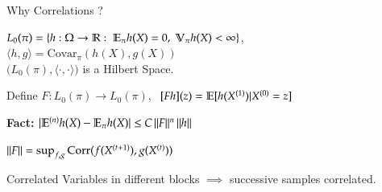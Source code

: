\documentclass[serif,mathserif,final]{beamer}
\newcommand{\itemlinespace}{0.22in}
\newcommand{\insertlinespace}{\vspace{\itemlinespace}}
\begin{document}
\begin{frame}{}
\begin{columns}[t]
\begin{column}{0.49\linewidth}
\begin{block}{\Huge Why Correlations ?}
{      $L_0(\pi) = \{ h:\Omega \rightarrow \mathbb{R} :\; \mathbb{E}_{\pi} h(X) = 0, \;
                        \mathbb{V}_{\pi}h(X) < \infty \}$, \hspace{0.05in}
      $\langle h, g \rangle = \text{Covar}_\pi(h(X), g(X))$ \\
      $\big(L_0(\pi), \langle \cdot, \cdot \rangle \big)$ is a Hilbert Space.
      \insertlinespace

      Define $F:L_0(\pi) \rightarrow L_0(\pi)$,
        $ \,\; [Fh](z) = \mathbb{E}[h(X^{(1)}) | X^{(0)} = z]$ \\
      \insertlinespace
 
      \textbf{Fact:}
      $| \mathbb{E}^{(n)} h(X) - \mathbb{E}_\pi h(X) | \leq C \, \|F\|^n \, \|h\|$
      \insertlinespace

      $\|F\| = \sup_{f,g} \text{Corr}(f(X^{(t+1)}), g(X^{(t)}))$
      \insertlinespace

      Correlated Variables in different blocks $\implies$ successive
      samples correlated. \\
      \insertlinespace

}
\end{block}
\end{column}
\end{columns}
\end{frame}
\end{document}
